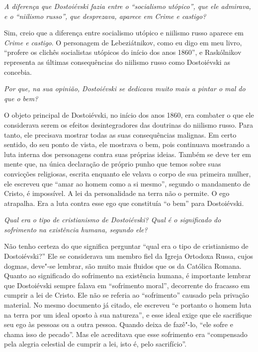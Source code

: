 \emph{A diferença que Dostoiévski fazia entre o ``socialismo utópico'', que
ele admirava, e o ``niilismo russo'', que desprezava, aparece em \emph{Crime e
castigo}?}

Sim, creio que a diferença entre socialismo utópico e niilismo russo
aparece em \emph{Crime e castigo}. O personagem de Lebeziátnikov, como eu
digo em meu livro, ``profere os clichês socialistas utópicos do início
dos anos 1860'', e Raskólnikov representa as últimas consequências do
niilismo russo como Dostoiévski as concebia.

\medskip

\emph{Por que, na sua opinião, Dostoiévski se dedicava muito mais a pintar
o mal do que o bem?}

O objeto principal de Dostoiévski, no início dos anos 1860, era combater
o que ele considerava serem os efeitos desintegradores das doutrinas do
niilismo russo. Para tanto, ele precisava mostrar todas as suas
consequências malignas. Em certo sentido, do seu ponto de vista, ele
mostrava o bem, pois continuava mostrando a luta interna dos personagens
contra suas próprias ideias. Também se deve ter em mente que, na única
declaração de próprio punho que temos sobre suas convicções religiosas,
escrita enquanto ele velava o corpo de sua primeira mulher, ele escreveu
que ``amar ao homem como a si mesmo'', segundo o mandamento de Cristo, é
impossível. A lei da personalidade na terra não o permite. O
ego atrapalha. Era a luta contra esse ego que constituía ``o bem'' para
Dostoiévski.

\medskip

\emph{Qual era o tipo de cristianismo de Dostoiévski? Qual é o significado
do sofrimento na existência humana, segundo ele?}

Não tenho certeza do que significa perguntar ``qual era o tipo de
cristianismo de Dostoiévski?'' Ele se considerava um membro fiel da
Igreja Ortodoxa Russa, cujos dogmas, deve"-se lembrar, são muito mais
fluidos que os da Católica Romana. Quanto ao significado do sofrimento
na existência humana, é importante lembrar que Dostoiévski sempre falava
em ``sofrimento moral'', decorrente do fracasso em cumprir a lei de
Cristo. Ele não se referia ao ``sofrimento'' causado pela privação
material. No mesmo documento já citado, ele escreveu ``e portanto o homem
luta na terra por um ideal oposto à sua natureza'', e esse
ideal exige que ele sacrifique seu ego às pessoas ou a outra pessoa.
Quando deixa de fazê"-lo, ``ele sofre e chama isso de pecado''. Mas ele
acreditava que esse sofrimento era ``compensado pela alegria celestial de
cumprir a lei, isto é, pelo sacrifício''.

